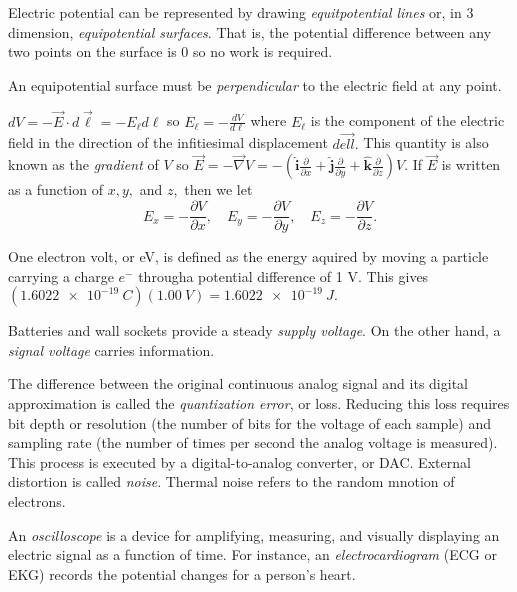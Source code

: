 \begin{definition}
    Electric potential can be represented by drawing \emph{equitpotential lines} or, in 3 dimension, \emph{equipotential surfaces}. That is, the potential difference between any two points on the surface is 0 so no work is required.
\end{definition}
\begin{note}
    An equipotential surface must be \emph{perpendicular} to the electric field at any point. 
\end{note}
\begin{remark}[Gradient of $V$]
    $dV = -\vec{E}\cdot d\vec{\ell} = -E_\ell d\ell$ so $E_\ell  = -\frac{dV}{d\ell}$ where $E_\ell$ is the component of the electric field in the direction of the infitiesimal displacement $d\vec{ell}.$ This quantity is also known as the \emph{gradient} of $V$ so $\vec{E} = -\vec{\nabla}V = -(\hat{\mathbf{i}}\frac{\partial}{\partial x} + \hat{\mathbf{j}}\frac{\partial}{\partial y} + \hat{\mathbf{k}}\frac{\partial}{\partial z})V$. If $\vec{E}$ is written as a function of $x, y,$ and $z,$ then we let $$E_x = -\frac{\partial V}{\partial x}, \quad E_y = -\frac{\partial V}{\partial y}, \quad E_z = -\frac{\partial V}{\partial z}.$$
\end{remark}
\begin{definition}
    One electron volt, or eV, is defined as the energy aquired by moving a particle carrying a charge $e^-$ througha  potential difference of 1 V. This gives $(\qty{1.6022e-19}{C})(\qty{1.00}{V}) = \qty{1.6022e-19}{J}.$
\end{definition}
\begin{definition}
    Batteries and wall sockets provide a steady \emph{supply voltage}. On the other hand, a \emph{signal voltage} carries information. 
\end{definition}
\begin{definition}
    The difference between the original continuous analog signal and its digital approximation is called the \emph{quantization error}, or loss. Reducing this loss requires bit depth or resolution (the number of bits for the voltage of each sample) and sampling rate (the number of times per second the analog voltage is measured). This process is executed by a digital-to-analog converter, or DAC. External distortion is called \emph{noise}. Thermal noise refers to the random mnotion of electrons. 
\end{definition}
\begin{definition}[Oscilloscope]
    An \emph{oscilloscope} is a device for amplifying, measuring, and visually displaying an electric signal as a function of time. For instance, an \emph{electrocardiogram} (ECG or EKG) records the potential changes for a person's heart.
\end{definition}